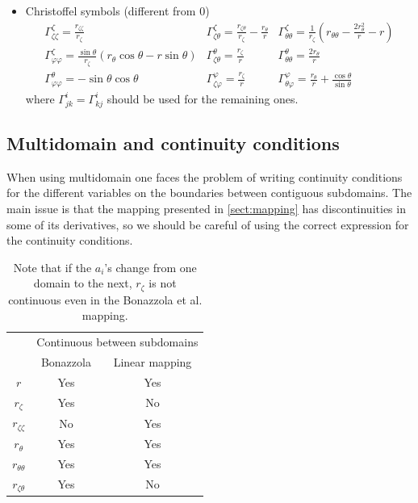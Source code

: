 \begin{itemize}
\item Christoffel symbols (different from 0)
\begin{equation}
\begin{array}{lll}
\displaystyle
\Gamma^{\zeta}_{\zeta\zeta}=\frac{r_{\zeta\zeta}}{r_\zeta}&
\displaystyle
\Gamma^{\zeta}_{\zeta\theta}=
\frac{r_{\zeta\theta}}{r_\zeta}-\frac{r_\theta}{r}&
\displaystyle
\Gamma^{\zeta}_{\theta\theta}=\frac{1}{r_\zeta}\left(r_{\theta\theta}-
\frac{2r_\theta^2}{r}-r\right)\\
\displaystyle
\Gamma^{\zeta}_{\varphi\varphi}=\frac{\sin\theta}{r_\zeta}(r_\theta\cos\theta
-r\sin\theta)&
\displaystyle
\Gamma^{\theta}_{\zeta\theta}=\frac{r_\zeta}{r}&
\displaystyle
\Gamma^{\theta}_{\theta\theta}=\frac{2r_{\theta}}{r}\\
\displaystyle
\Gamma^{\theta}_{\varphi\varphi}=-\sin\theta\cos\theta&
\displaystyle
\Gamma^{\varphi}_{\zeta\varphi}=\frac{r_\zeta}{r}&
\displaystyle
\Gamma^{\varphi}_{\theta\varphi}=\frac{r_\theta}{r}+
\frac{\cos\theta}{\sin\theta}
\end{array}
\end{equation}
where $\Gamma^i_{jk}=\Gamma^i_{kj}$ should be used for the remaining
ones.
\end{itemize}

\subsection{Multidomain and continuity conditions}

When using multidomain one faces the problem of writing continuity
conditions for the different variables on the boundaries between
contiguous subdomains. The main issue is that the mapping presented in
\ref{sect:mapping} has discontinuities in some of its derivatives, so
we should be careful of using the correct expression for the continuity
conditions.

\begin{table}
\begin{center}
\begin{tabular}{c|c|c}
& \multicolumn{2}{c}{Continuous between subdomains} \\
& Bonazzola & Linear mapping \\
\hline
$r$ & Yes & Yes\\
$r_\zeta$ & Yes  & No\\
$r_{\zeta\zeta}$ & No & Yes \\
$r_\theta$ & Yes & Yes \\
$r_{\theta\theta}$ & Yes & Yes \\
$r_{\zeta\theta}$ & Yes & No \\
\end{tabular}
\end{center}
\caption[]{Note that if the $a_i$'s change from one domain to the next,
$r_\zeta$ is not continuous even in the Bonazzola et al. mapping.}
\end{table}

